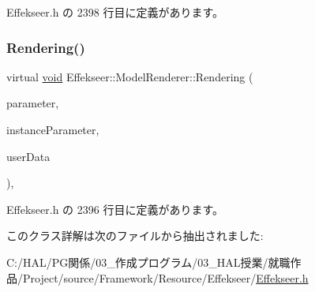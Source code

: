  Effekseer.\+h の 2398 行目に定義があります。

\mbox{\label{class_effekseer_1_1_model_renderer_af83aa3f24f7dc3e7681579f07d0f9086}} 
\subsubsection{\texorpdfstring{Rendering()}{Rendering()}}
{\footnotesize\ttfamily virtual \mbox{\hyperlink{namespace_effekseer_ab34c4088e512200cf4c2716f168deb56}{void}} Effekseer\+::\+Model\+Renderer\+::\+Rendering (\begin{DoxyParamCaption}\item[{const \mbox{\hyperlink{struct_effekseer_1_1_model_renderer_1_1_node_parameter}{Node\+Parameter}} \&}]{parameter,  }\item[{const \mbox{\hyperlink{struct_effekseer_1_1_model_renderer_1_1_instance_parameter}{Instance\+Parameter}} \&}]{instance\+Parameter,  }\item[{\mbox{\hyperlink{namespace_effekseer_ab34c4088e512200cf4c2716f168deb56}{void}} $\ast$}]{user\+Data }\end{DoxyParamCaption})\hspace{0.3cm}{\ttfamily [inline]}, {\ttfamily [virtual]}}



 Effekseer.\+h の 2396 行目に定義があります。



このクラス詳解は次のファイルから抽出されました\+:\begin{DoxyCompactItemize}
\item 
C\+:/\+H\+A\+L/\+P\+G関係/03\+\_\+作成プログラム/03\+\_\+\+H\+A\+L授業/就職作品/\+Project/source/\+Framework/\+Resource/\+Effekseer/\mbox{\hyperlink{_effekseer_8h}{Effekseer.\+h}}\end{DoxyCompactItemize}
